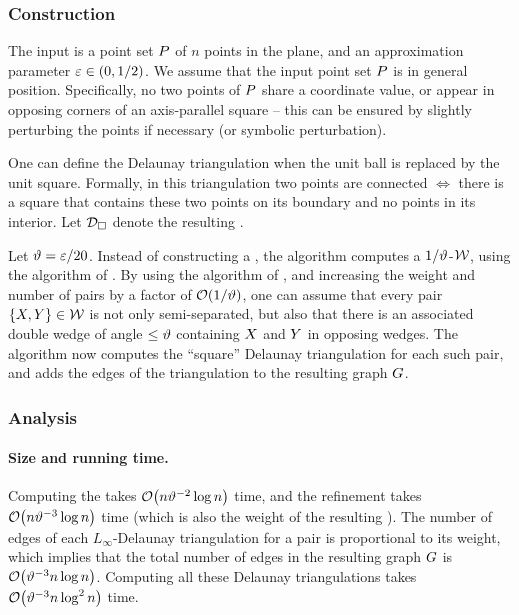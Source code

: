 \documentclass[12pt]{article}%
\begin{document}
\subsubsection{Construction}

The input is a point set $P$ of $n$ points in the plane, and an
approximation parameter $\varepsilon \in (0,1/2)$.  We assume that the input
point set $P$ is in general position. Specifically, no two points of
$P$ share a coordinate value, or appear in opposing corners of an
axis-parallel square -- this can be ensured by slightly perturbing the
points if necessary (or symbolic perturbation).


One can define the Delaunay triangulation when the unit ball is
replaced by the unit square. Formally, in this triangulation two
points are connected $\iff$ there is a square that contains these two
points on its boundary and no points in its interior. Let
$\mathcal{D}_\square$ denote the resulting .

Let $\vartheta = \varepsilon/20$.  Instead of constructing a \WSPD, the algorithm
computes a $1/\vartheta$-\SSPD $\mathcal{W}$, using the algorithm of
. By using the algorithm of ,
and increasing the weight and number of pairs by a factor of
$\mathcal{O}(1/\vartheta)$, one can assume that every pair
$\{ X, Y \} \in \mathcal{W}$ is not only semi-separated, but also that
there is an associated double wedge of angle $\leq \vartheta$ containing
$X$ and $Y$ in opposing wedges.  The algorithm now computes the
``square'' Delaunay triangulation for each such pair, and adds the
edges of the triangulation to the resulting graph $G$.



\subsubsection{Analysis}

\paragraph{Size and running time.}

Computing the \SSPD takes $\Of\pth{n \epsA^{-2} \log n}$ time, and the
refinement takes $\Of\pth{n \epsA^{-3} \log n}$ time (which is also
the weight of the resulting \SSPD). The number of edges of each
$L_\infty$-Delaunay triangulation for a pair is proportional to its
weight, which implies that the total number of edges in the resulting
graph $G$ is $\Of\pth{ \epsA^{-3} n\log n}$. Computing all these
Delaunay triangulations takes $\Of\pth{ \epsA^{-3}n \log^2 n}$ time.
\end{document}
